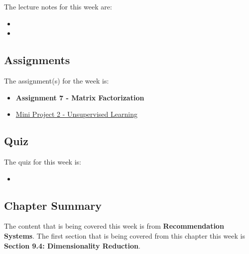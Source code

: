 \noindent The lecture notes for this week are:

\begin{itemize}
    \item {}
    \item {}
\end{itemize}

\subsection{Assignments}

The assignment(s) for the week is:

\begin{itemize}
    \item \textbf{Assignment 7 - Matrix Factorization}
    \item \href{https://github.com/cu-cspb-4622-fall-2024/P2-QuantumCompiler}{Mini Project 2 - Unsupervised Learning}
\end{itemize}

\subsection{Quiz}

The quiz for this week is:

\begin{itemize}
    \item {}
\end{itemize}

\newpage

\subsection{Chapter Summary}

The content that is being covered this week is from \textbf{Recommendation Systems}. The first section that is being covered from this chapter this week is \textbf{Section 9.4: Dimensionality Reduction}.

